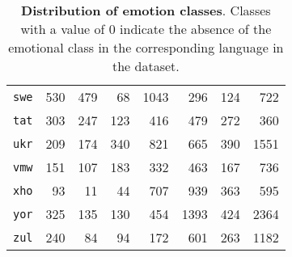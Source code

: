 \begin{table}[t]
\begin{tabular}{@{}lrrrrrrr@{}}
    \texttt{swe} & 530 & 479 & 68 & 1043 & 296 & 124 & 722 \\
    \texttt{tat} & 303 & 247 & 123 & 416 & 479 & 272 & 360 \\
    \texttt{ukr} & 209 & 174 & 340 & 821 & 665 & 390 & 1551 \\
    \texttt{vmw} & 151 & 107 & 183 & 332 & 463 & 167 & 736 \\
    \texttt{xho} & 93 & 11 & 44 & 707 & 939 & 363 & 595 \\
    \texttt{yor} & 325 & 135 & 130 & 454 & 1393 & 424 & 2364 \\
    \texttt{zul} & 240 & 84 & 94 & 172 & 601 & 263 & 1182 \\
    \bottomrule
  \end{tabular}
  \caption{\textbf{Distribution of emotion classes}. Classes with a value of 0 indicate the absence of the emotional class in the corresponding language in the dataset.}
  \label{tab:class_distribution}
\end{table}

